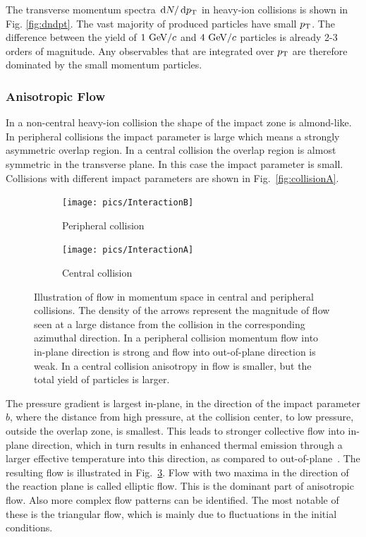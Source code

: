 The transverse momentum spectra $\,\textrm d{N}/\,\textrm d{p_{\rm T}}$ in heavy-ion collisions is shown in Fig. \ref{fig:dndpt}. The vast majority of produced particles have small $p_{\rm T}$. The difference between the yield of $1\mbox{~GeV/$c$}$ and $4\mbox{~GeV/$c$}$ particles is already 2-3 orders of magnitude. Any observables that are integrated over $p_{\rm T}$ are therefore dominated by the small momentum particles.




\subsubsection{Anisotropic Flow}
In a non-central heavy-ion collision the shape of the impact zone is almond-like. In peripheral collisions the impact parameter is large which means a strongly asymmetric overlap region.  In a central collision the overlap region is almost symmetric in the transverse plane. In this case the impact parameter is small. Collisions with different impact parameters are shown in Fig.~\ref{fig:collisionA}.

\begin{figure}[b!]
\centering
        \begin{subfigure}[b]{0.52\textwidth}
                \centering
            	\texttt{[image: pics/InteractionB]}
                \caption{Peripheral collision}
                \label{fig:InteractionB}
        \end{subfigure}
        \begin{subfigure}[b]{0.45\textwidth}
                \centering
               \texttt{[image: pics/InteractionA]}
                \caption{Central collision}
                \label{fig:InteractionA}
        \end{subfigure}
	\caption[Illustration of flow in momentum space in central and peripheral collisions.]{Illustration of flow in momentum space in central and peripheral collisions. The density of the arrows represent the magnitude of flow seen at a large distance from the collision in the corresponding azimuthal direction. In a peripheral collision momentum flow into in-plane direction is strong and flow into out-of-plane direction is weak. In a central collision anisotropy in flow is smaller, but the total yield of particles is larger.}
	\label{fig:flow}
\end{figure}

The pressure gradient is largest in-plane, in the direction of the impact parameter $b$, where the distance from high pressure, at the collision center, to low pressure, outside the overlap zone, is smallest. This leads to stronger collective flow into in-plane direction, which in turn results in enhanced thermal emission through a larger effective temperature into this direction, as compared to out-of-plane~\cite{Ollitrault:1992,Ollitrault:1993, Heinz:2002}. The resulting flow is illustrated in Fig.~\ref{fig:flow}. Flow with two maxima in the direction of the reaction plane is called elliptic flow. This is the dominant part of anisotropic flow. Also more complex flow patterns can be identified. The most notable of these is the triangular flow, which is mainly due to fluctuations in the initial conditions.

